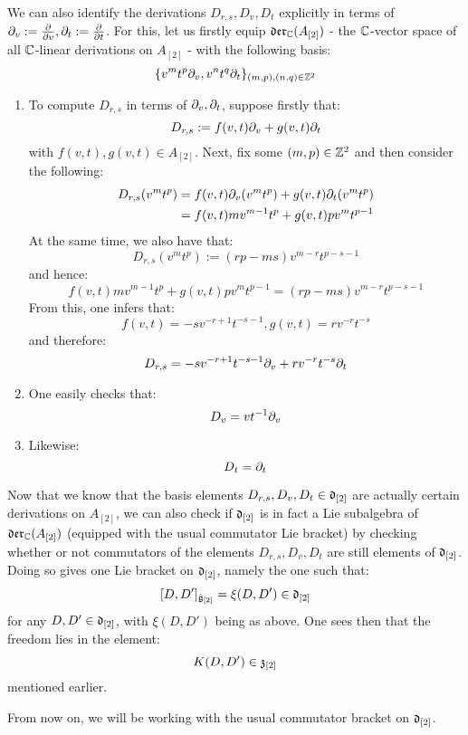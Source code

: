\begin{remark}
                We can also identify the derivations $D_{r, s}, D_v, D_t$ explicitly in terms of $\partial_v := \frac{\partial}{\partial v}, \partial_t := \frac{\partial}{\partial t}$. For this, let us firstly equip $\mathfrak{der}_{\mathbb{C}}(A_{[2]})$ - the $\mathbb{C}$-vector space of all $\mathbb{C}$-linear derivations on $A_{[2]}$ - with the following basis:
                    $$\{ v^m t^p \partial_v, v^n t^q \partial_t \}_{(m, p), (n, q) \in \mathbb{Z}^2}$$
                \begin{enumerate}
                    \item To compute $D_{r, s}$ in terms of $\partial_v, \partial_t$, suppose firstly that:
                        $$D_{r, s} := f(v, t) \partial_v + g(v, t) \partial_t$$
                    with $f(v, t), g(v, t) \in A_{[2]}$. Next, fix some $(m, p) \in \mathbb{Z}^2$ and then consider the following:
                        $$
                            \begin{aligned}
                                D_{r, s}( v^m t^p ) & = f(v, t) \partial_v( v^m t^p ) + g(v, t) \partial_t( v^m t^p )
                                \\
                                & = f(v, t) m v^{m - 1} t^p + g(v, t) p v^m t^{p - 1}
                            \end{aligned}
                        $$
                    At the same time, we also have that:
                        $$D_{r, s}(v^m t^p) := ( rp - ms ) v^{m - r} t^{p - s - 1}$$
                    and hence:
                        $$f(v, t) m v^{m - 1} t^p + g(v, t) p v^m t^{p - 1} = ( rp - ms ) v^{m - r} t^{p - s - 1}$$
                    From this, one infers that:
                        $$f(v, t) = -s v^{-r + 1} t^{-s - 1}, g(v, t) = r v^{-r} t^{-s}$$
                    and therefore:
                        $$D_{r, s} = -s v^{-r + 1} t^{-s - 1} \partial_v + r v^{-r} t^{-s} \partial_t$$
                    \item One easily checks that:
                        $$D_v = v t^{-1} \partial_v$$
                    \item Likewise:
                        $$D_t = \partial_t$$
                \end{enumerate}

                Now that we know that the basis elements $D_{r, s}, D_v, D_t \in \mathfrak{d}_{[2]}$ are actually certain derivations on $A_{[2]}$, we can also check if $\mathfrak{d}_{[2]}$ is in fact a Lie subalgebra of $\mathfrak{der}_{\mathbb{C}}(A_{[2]})$ (equipped with the usual commutator Lie bracket) by checking whether or not commutators of the elements $D_{r, s}, D_v, D_t$ are still elements of $\mathfrak{d}_{[2]}$. Doing so gives one Lie bracket on $\mathfrak{d}_{[2]}$, namely the one such that:
                    $$[D, D']_{\hat{\mathfrak{g}}_{[2]}} = \xi(D, D') \in \mathfrak{d}_{[2]}$$
                for any $D, D' \in \mathfrak{d}_{[2]}$, with $\xi(D, D')$ being as above. One sees then that the freedom lies in the element:
                    $$K(D, D') \in \mathfrak{z}_{[2]}$$
                mentioned earlier. 
            \end{remark}
            \begin{convention}
                From now on, we will be working with the usual commutator bracket on $\mathfrak{d}_{[2]}$. 
            \end{convention}
            
